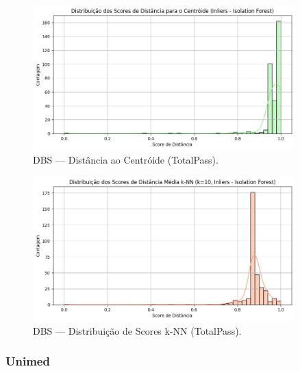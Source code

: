 \begin{figure}[H]
    \centering
    \includegraphics[width=0.9\textwidth]{imagens/totalpass_centroid.png}
    \caption{DBS — Distância ao Centróide (TotalPass).}
    \label{fig:totalpass_centroid}
\end{figure}

\begin{figure}[H]
    \centering
    \includegraphics[width=0.9\textwidth]{imagens/totalpass_knn.png}
    \caption{DBS — Distribuição de Scores k-NN (TotalPass).}
    \label{fig:totalpass_knn}
\end{figure}

\subsubsection*{Unimed}

